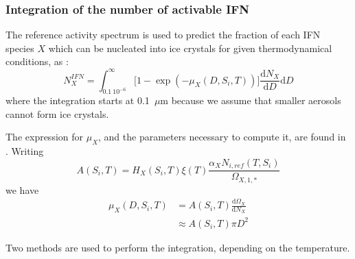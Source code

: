 \subsubsection{Integration of the number of activable IFN}

The reference activity spectrum is used to predict the fraction of each IFN species $X$ which can be nucleated into ice crystals for given thermodynamical conditions, as \citep[Eq.\ (9) from][]{Phillips2008}:
\begin{equation}
 N_X^{IFN} = \int_{0.1~10^{-6}}^\infty \big[ 1 - \exp(- \mu_X(D,S_i,T)) \big] \frac{\mathrm{d}N_X}{\mathrm{d}D} \mathrm{d}D
\end{equation}
where the integration starts at 0.1~$\mu$m because we assume that smaller aerosols cannot form ice crystals.

The expression for $\mu_X$, and the parameters necessary to compute it, are found in \citet[][Eqs.\ (10)-(12) and Table 1]{Phillips2008}. Writing
\begin{equation}
 A(S_i,T) = H_X(S_i,T) \xi(T) \frac{\alpha_X N_{i,ref} (T,S_i)}{\Omega_{X,1,*}}
\end{equation}
we have
\begin{align}
 \mu_X(D,S_i,T) &= A(S_i,T) \frac{\mathrm{d}\Omega_X}{\mathrm{d}N_X} \\
 &\approx A(S_i,T) \pi D^2
\end{align}

Two methods are used to perform the integration, depending on the temperature.

